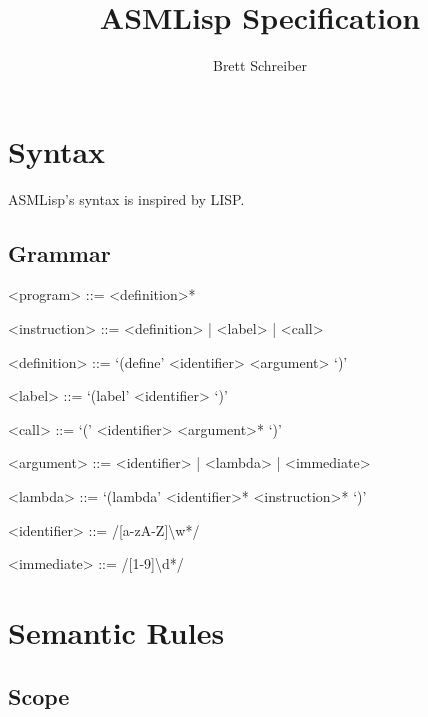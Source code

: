 \documentclass{article}
\title{ASMLisp Specification}
\author{Brett Schreiber}
\begin{document}
\maketitle

\section{Syntax}
ASMLisp's syntax is inspired by LISP.
\subsection{Grammar}
\begin{grammar}
<program> ::= <definition>*

<instruction> ::= <definition> | <label> | <call>

<definition> ::= `(define' <identifier> <argument> `)'

<label> ::= `(label' <identifier> `)'

<call> ::= `(' <identifier> <argument>* `)'

<argument> ::= <identifier> | <lambda> | <immediate>

<lambda> ::= `(lambda' <identifier>* <instruction>* `)'

<identifier> ::= /[a-zA-Z]\textbackslash w*/

<immediate> ::= /[1-9]\textbackslash d*/
\end{grammar}

\section{Semantic Rules}
\subsection{Scope}
\end{document}
